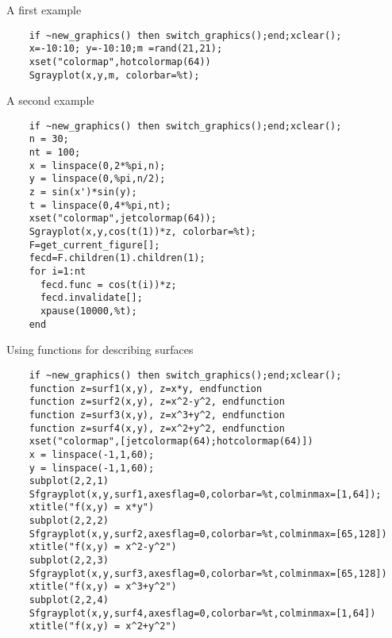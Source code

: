 \begin{examples}
\noindent A first example
  \begin{Verbatim}
    if ~new_graphics() then switch_graphics();end;xclear();
    x=-10:10; y=-10:10;m =rand(21,21);
    xset("colormap",hotcolormap(64))
    Sgrayplot(x,y,m, colorbar=%t);
  \end{Verbatim}

\noindent A second example

  \begin{Verbatim}
    if ~new_graphics() then switch_graphics();end;xclear();
    n = 30;
    nt = 100;
    x = linspace(0,2*%pi,n);
    y = linspace(0,%pi,n/2);
    z = sin(x')*sin(y);
    t = linspace(0,4*%pi,nt);
    xset("colormap",jetcolormap(64));
    Sgrayplot(x,y,cos(t(1))*z, colorbar=%t);
    F=get_current_figure[];
    fecd=F.children(1).children(1);
    for i=1:nt
      fecd.func = cos(t(i))*z;
      fecd.invalidate[];
      xpause(10000,%t);
    end
  \end{Verbatim}

  \noindent Using functions for describing surfaces

  \begin{Verbatim}
    if ~new_graphics() then switch_graphics();end;xclear();
    function z=surf1(x,y), z=x*y, endfunction
    function z=surf2(x,y), z=x^2-y^2, endfunction
    function z=surf3(x,y), z=x^3+y^2, endfunction
    function z=surf4(x,y), z=x^2+y^2, endfunction
    xset("colormap",[jetcolormap(64);hotcolormap(64)])
    x = linspace(-1,1,60);
    y = linspace(-1,1,60);
    subplot(2,2,1)
    Sfgrayplot(x,y,surf1,axesflag=0,colorbar=%t,colminmax=[1,64]);
    xtitle("f(x,y) = x*y")
    subplot(2,2,2)
    Sfgrayplot(x,y,surf2,axesflag=0,colorbar=%t,colminmax=[65,128])
    xtitle("f(x,y) = x^2-y^2")
    subplot(2,2,3)
    Sfgrayplot(x,y,surf3,axesflag=0,colorbar=%t,colminmax=[65,128])
    xtitle("f(x,y) = x^3+y^2")
    subplot(2,2,4)
    Sfgrayplot(x,y,surf4,axesflag=0,colorbar=%t,colminmax=[1,64])
    xtitle("f(x,y) = x^2+y^2")
  \end{Verbatim}


\end{examples}
\begin{manseealso}
\end{manseealso}
